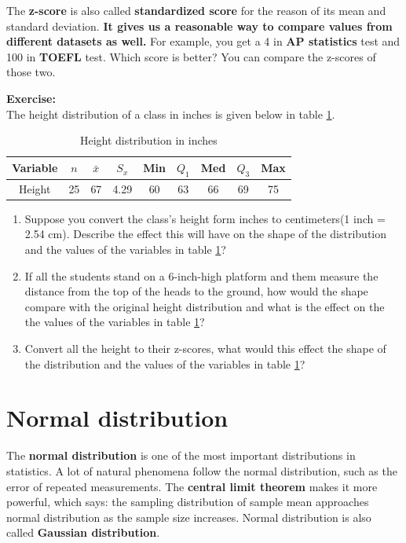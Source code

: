 \documentclass[a4paper, 12pt,twoside]{book}
\begin{document}
\colorbox{babypink}{\begin{minipage}{0.9\textwidth}
The \textbf{z-score} is also called \textbf{standardized score} for the reason of its mean and standard deviation.\textbf{ It gives us a reasonable way to compare values from different datasets as well.} For example, you get a 4 in \textbf{AP statistics} test and 100 in \textbf{TOEFL} test. Which score is better?  You can compare the z-scores of those two. 
\end{minipage}
}
\newpage

\colorbox{champagne}{\parbox{15.2cm}{
\textbf{Exercise:}\vspace{0.3cm}\\
The height distribution of a class in inches is given below in table  \ref{Heightdistribution}. 
\begin{table}[H]
\centering
\begin{tabular}{c|cccccccc}
Variable&$n$&$\bar{x}$&$S_x$&Min&$Q_1$&Med&$Q_3$&Max\\
\hline
Height&25&67&4.29&60&63&66&69&75\\
\end{tabular}
\caption{Height distribution in inches}
\label{Heightdistribution}
\end{table}
\begin{enumerate}[(1)]
 \item Suppose you convert the class's height form inches to centimeters(1 inch = 2.54 cm). Describe the effect this will have on the shape of the distribution and the values of the variables in table \ref{Heightdistribution}?
 \item If all the students stand on a 6-inch-high platform and them measure the distance from the top of the heads to the ground, how would the shape compare with the original height  distribution and what is the effect on the the values of the variables in table \ref{Heightdistribution}?
 \item Convert all the height to their z-scores, what would this effect the shape of the distribution and the values of the variables in table \ref{Heightdistribution}?
\end{enumerate}
}}

\newpage

\section{Normal distribution}
The \textbf{normal distribution} is one of the most important distributions in statistics. A lot of natural phenomena follow the normal distribution, such as the error of repeated measurements. The \textbf{central limit theorem} makes it more powerful, which says: the sampling distribution of sample mean approaches normal distribution as the sample size increases. Normal distribution is also called \textbf{Gaussian distribution}.
\vspace{0.6cm}
\end{document}
